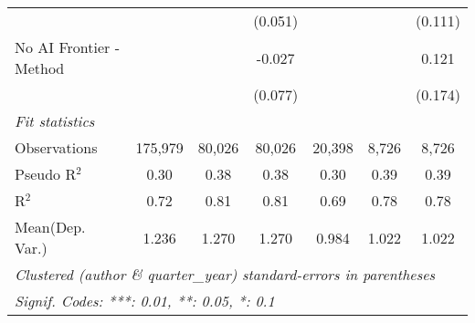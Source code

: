 \begin{tabular}{lcccccc}
                           &                &                & (0.051)        &                &               & (0.111)\\   
   No AI Frontier - Method &                &                & -0.027         &                &               & 0.121\\   
                           &                &                & (0.077)        &                &               & (0.174)\\   
   \midrule
   \emph{Fit statistics}\\
   Observations            & 175,979        & 80,026         & 80,026         & 20,398         & 8,726         & 8,726\\  
   Pseudo R$^2$            & 0.30           & 0.38           & 0.38           & 0.30           & 0.39          & 0.39\\  
   R$^2$                   & 0.72           & 0.81           & 0.81           & 0.69           & 0.78          & 0.78\\  
Mean(Dep. Var.) & 1.236 & 1.270 & 1.270 & 0.984 & 1.022 & 1.022 \\
   \midrule \midrule
   \multicolumn{7}{l}{\emph{Clustered (author \& quarter\_year) standard-errors in parentheses}}\\
   \multicolumn{7}{l}{\emph{Signif. Codes: ***: 0.01, **: 0.05, *: 0.1}}\\
\end{tabular}
\par\endgroup
